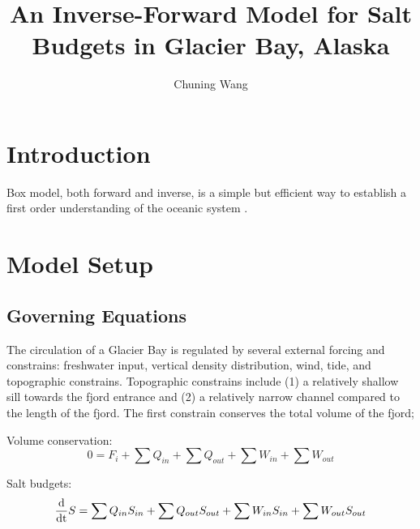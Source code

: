 \documentclass{article}
\title{An Inverse-Forward Model for Salt Budgets in Glacier Bay, Alaska}
\author{Chuning Wang}
\begin{document}
\maketitle

\section{Introduction}
Box model, both forward and inverse, is a simple but efficient way to establish a first order understanding of the oceanic system \citep{guan2008stommel, stommel1961thermohaline}.

\section{Model Setup}
\label{sec:method}
\subsection{Governing Equations}
The circulation of a Glacier Bay is regulated by several external forcing and constrains: freshwater input, vertical density distribution, wind, tide, and topographic constrains. Topographic constrains include (1) a relatively shallow sill towards the fjord entrance and (2) a relatively narrow channel compared to the length of the fjord. The first constrain conserves the total volume of the fjord;


Volume conservation:
\begin{equation}
  0=F_i+\sum Q_{in}+\sum Q_{out}+\sum W_{in}+\sum W_{out}
  \label{eq:vconserv}
\end{equation}

Salt budgets:
\begin{equation}
  \frac{\rm{d}}{\rm{d}t}S=\sum Q_{in}S_{in}+\sum Q_{out}S_{out}+\sum W_{in}S_{in}+\sum W_{out}S_{out}
  \label{eq:sbudget}
\end{equation}




\end{document}
